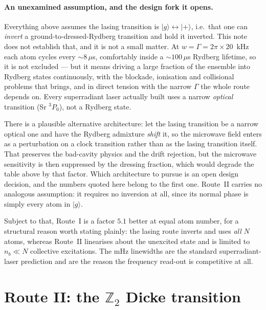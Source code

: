 \documentclass[11pt,a4paper]{article}
\newcommand{\ket}[1]{\lvert #1 \rangle}
\begin{document}
\paragraph{An unexamined assumption, and the design fork it opens.} Everything above assumes
the lasing transition is $\ket{g}\leftrightarrow\ket{+}$, i.e.\ that one can \emph{invert} a
ground-to-dressed-Rydberg transition and hold it inverted. This note does not establish that,
and it is not a small matter. At $w=\Gamma=2\pi\times20$~kHz each atom cycles every
${\sim}8\,\mu$s, comfortably inside a ${\sim}100\,\mu$s Rydberg lifetime, so it is not
excluded --- but it means driving a large fraction of the ensemble into Rydberg states
continuously, with the blockade, ionisation and collisional problems that brings, and in
direct tension with the narrow $\Gamma$ the whole route depends on. Every superradiant laser
actually built uses a narrow \emph{optical} transition (Sr $^3P_0$), not a Rydberg state.

There is a plausible alternative architecture: let the lasing transition be a narrow optical
one and have the Rydberg admixture \emph{shift} it, so the microwave field enters as a
perturbation on a clock transition rather than as the lasing transition itself. That preserves
the bad-cavity physics and the drift rejection, but the microwave sensitivity is then
suppressed by the dressing fraction, which would degrade the table above by that factor. Which
architecture to pursue is an open design decision, and the numbers quoted here belong to the
first one. Route~II carries no analogous assumption: it requires no inversion at all, since
its normal phase is simply every atom in $\ket{g}$.

\medskip
Subject to that, Route~I is a factor $5.1$ better at equal atom number, for a structural
reason worth stating plainly: the lasing route inverts and uses \emph{all} $N$ atoms, whereas Route~II linearises
about the unexcited state and is limited to $n_b\ll N$ collective excitations. The mHz
linewidths are the standard superradiant-laser prediction and are the reason the frequency
read-out is competitive at all.

\section{Route II: the $\mathbb{Z}_2$ Dicke transition}
\label{sec:z2}
\end{document}
